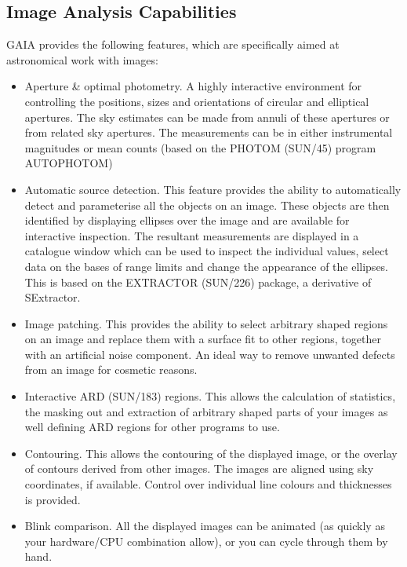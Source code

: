 \documentclass[twoside,11pt]{article}
\newcommand{\xref}[3]{#1}
\newcommand{\xlabel}[1]{}
\renewcommand{\_}{\texttt{\symbol{95}}}
\begin{document}
\subsection{\xlabel{image_analysis_capabilities}Image Analysis Capabilities}
GAIA provides the following features, which are specifically aimed at
astronomical work with images:
\begin{itemize}
\item Aperture \& optimal photometry. A highly interactive environment
  for controlling the positions, sizes and orientations of circular
  and elliptical apertures. The sky estimates can be made from
  annuli of these apertures or from related sky apertures. The
  measurements can be in either instrumental magnitudes or
  mean counts (based on the PHOTOM (\xref{SUN/45}{sun45}{})
  program \xref{AUTOPHOTOM}{sun45}{AUTOPHOTOM})

\item Automatic source detection. This feature provides the ability to
  automatically detect and parameterise all the objects on an
  image. These objects are then identified by displaying ellipses over
  the image and are available for interactive inspection. The resultant
  measurements are displayed in a catalogue window which can be used to
  inspect the individual values, select data on the bases of range
  limits and change the appearance of the ellipses. This is based on the
  EXTRACTOR (\xref{SUN/226}{sun226}{}) package, a derivative of
  SExtractor.

\item Image patching. This provides the ability to select arbitrary
  shaped regions on an image and replace them with a surface fit
  to other regions, together with an artificial noise component.
  An ideal way to remove unwanted defects from an image for
  cosmetic reasons.

\item Interactive ARD (\xref{SUN/183}{sun183}{}) regions. This
  allows the calculation of statistics, the masking out and
  extraction of arbitrary shaped parts of your images as well
  defining ARD regions for other programs to use.

\item Contouring. This allows the contouring of the displayed image,
 or the overlay of contours derived from other images. The images are
 aligned using sky coordinates, if available. Control over individual
 line colours and thicknesses is provided.

\item Blink comparison. All the displayed images can be animated
  (as quickly as your hardware/CPU combination allow), or
  you can cycle through them by hand.


\end{itemize}
\end{document}
